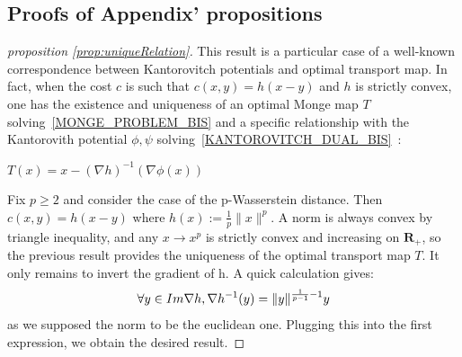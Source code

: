 \documentclass[runningheads]{llncs}
\newcommand\mycitet[1]{\cite{#1}}
\begin{document}
\subsection{Proofs of Appendix' propositions}
\begin{proof}[proposition \ref{prop:uniqueRelation}]
This result is a particular case of a well-known correspondence between Kantorovitch potentials and optimal transport map. In fact, when the cost $c$ is such that $c(x,y)=h(x-y)$ and $h$ is strictly convex, one has the existence and uniqueness of an optimal Monge map $T$ solving~\eqref{MONGE_PROBLEM_BIS} and a specific relationship with the Kantorovith potential $\phi,\psi$ solving~\eqref{KANTOROVITCH_DUAL_BIS}~\mycitet{Villani,santambrogio2017euclidean}:
\begin{center}
$T(x)=x- (\nabla h)^{-1}(\nabla \phi(x)) $
\end{center}
Fix $p \geqslant 2$ and consider the case of the p-Wasserstein distance. Then $c(x,y)=h(x-y)$ where $h(x):= \frac{1}{p} \|x\|^p$. A norm is always convex by triangle inequality, and any $x \rightarrow x^p$ is strictly convex and increasing on $\mathbf{R}_+$, so the previous result provides the uniqueness of the optimal transport map $T$. It only remains to invert the gradient of h. A quick calculation gives:
\[ \forall y \in Im\nabla h, \\ \nabla h ^{-1}(y)= \|y\|^{\frac{1}{p-1}-1}y\]
as we supposed the norm to be the euclidean one. Plugging this into the first expression, we obtain the desired result.
\end{proof} 
\end{document}
